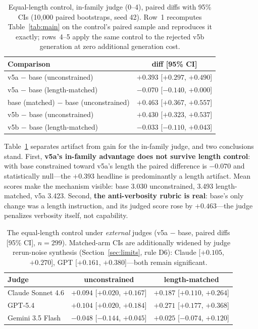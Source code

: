 \documentclass[11pt]{article}
\begin{document}
\begin{table}[t]
\centering
\small
\caption{Equal-length control, in-family judge (0--4), paired diffs
with 95\% CIs (10{,}000 paired bootstraps, seed 42). Row~1 recomputes
Table~\ref{tab:main} on the control's paired sample and reproduces it
exactly; rows~4--5 apply the same control to the rejected v5b
generation at zero additional generation cost.}
\label{tab:eqlen}
\begin{tabular}{@{}lc@{}}
\toprule
Comparison & diff [95\% CI] \\
\midrule
v5a $-$ base (unconstrained) & $+0.393$ [$+0.297$, $+0.490$] \\
v5a $-$ base (length-matched) & $-0.070$ [$-0.140$, $+0.000$] \\
base (matched) $-$ base (unconstrained) & $+0.463$ [$+0.367$, $+0.557$] \\
\midrule
v5b $-$ base (unconstrained) & $+0.430$ [$+0.323$, $+0.537$] \\
v5b $-$ base (length-matched) & $-0.033$ [$-0.110$, $+0.043$] \\
\bottomrule
\end{tabular}
\end{table}

Table~\ref{tab:eqlen} separates artifact from gain for the in-family
judge, and two conclusions stand. First, \textbf{v5a's in-family
advantage does not survive length control}: with base constrained
toward v5a's length the paired difference is $-0.070$ and statistically
null---the $+0.393$ headline is predominantly a length artifact. Mean
scores make the mechanism visible: base 3.030 unconstrained, 3.493
length-matched, v5a 3.423. Second, \textbf{the anti-verbosity rubric
is real}: base's only change was a length instruction, and its judged
score rose by $+0.463$---the judge penalizes verbosity itself, not
capability.

\begin{table}[t]
\centering
\small
\caption{The equal-length control under \emph{external} judges (v5a
$-$ base, paired diffs [95\% CI], $n{=}299$). Matched-arm CIs are
additionally widened by judge rerun-noise synthesis
(Section~\ref{sec:limits}, rule D6): Claude [$+0.105$, $+0.270$], GPT
[$+0.161$, $+0.380$]---both remain significant.}
\label{tab:eqlen_ext}
\begin{tabular}{@{}lcc@{}}
\toprule
Judge & unconstrained & length-matched \\
\midrule
Claude Sonnet 4.6 & $+0.094$ [$+0.020$, $+0.167$] & $\mathbf{+0.187}$ [$+0.110$, $+0.264$] \\
GPT-5.4 & $+0.104$ [$+0.020$, $+0.184$] & $\mathbf{+0.271}$ [$+0.177$, $+0.368$] \\
Gemini 3.5 Flash & $-0.048$ [$-0.144$, $+0.045$] & $+0.025$ [$-0.074$, $+0.120$] \\
\bottomrule
\end{tabular}
\end{table}
\end{document}
